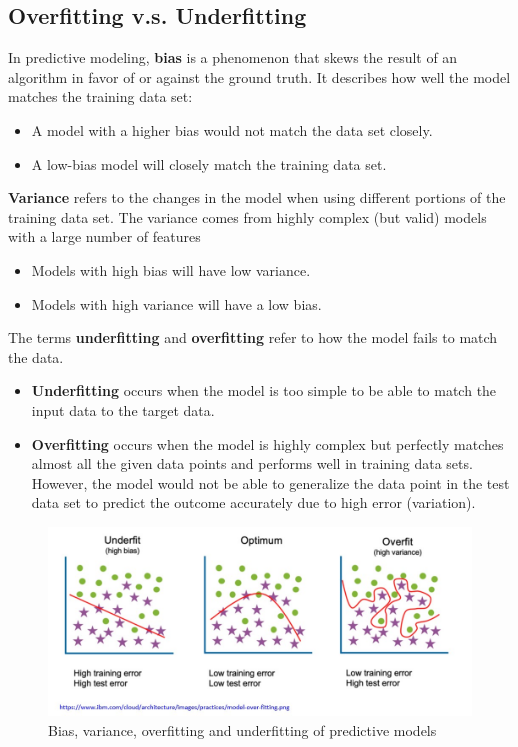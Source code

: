 \documentclass[
]{book}
\providecommand{\tightlist}{%
  \setlength{\itemsep}{0pt}\setlength{\parskip}{0pt}}
\begin{document}
\hypertarget{overfitting-v.s.-underfitting}{%
\subsection{Overfitting v.s. Underfitting}\label{overfitting-v.s.-underfitting}}

In predictive modeling, \textbf{bias} is a phenomenon that skews the result of an algorithm in favor of or against the ground truth. It describes how well the model matches the training data set:

\begin{itemize}
\tightlist
\item
  A model with a higher bias would not match the data set closely.
\item
  A low-bias model will closely match the training data set.
\end{itemize}

\textbf{Variance} refers to the changes in the model when using different portions of the training data set. The variance comes from highly complex (but valid) models with a large number of features

\begin{itemize}
\tightlist
\item
  Models with high bias will have low variance.
\item
  Models with high variance will have a low bias.
\end{itemize}

The terms \textbf{underfitting} and \textbf{overfitting} refer to how the model fails to match the data.

\begin{itemize}
\item
  \textbf{Underfitting} occurs when the model is too simple to be able to match the input data to the target data.
\item
  \textbf{Overfitting} occurs when the model is highly complex but perfectly matches almost all the given data points and performs well in training data sets. However, the model would not be able to generalize the data point in the test data set to predict the outcome accurately due to high error (variation).
\end{itemize}

\begin{figure}

{\centering \includegraphics[width=0.8\linewidth]{img09/w09-BiasVarianceOverUnderFitting} 

}

\caption{Bias, variance, overfitting and underfitting of predictive models}\label{fig:unnamed-chunk-229}
\end{figure}
\end{document}
